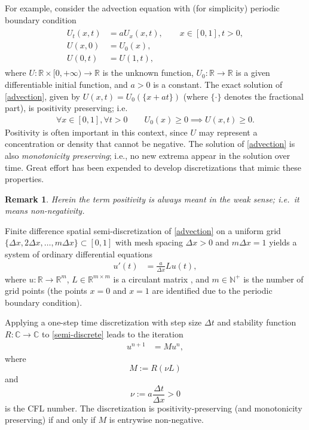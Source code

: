 \documentclass[smallextended,numbook,runningheads]{svjour3}     %
\newtheorem{remark}{Remark}
\newtheorem{remark}{Remark}
\newcommand{\dt}{\Delta t}
\newcommand{\dx}{\Delta x}
\begin{document}
For example, consider the advection equation with (for simplicity) periodic boundary condition
\begin{align}\label{advection}
\begin{split}
	U_t (x,t) &= a U_x(x,t), \qquad x\in[0,1], t>0, \\
	U(x,0) &= U_0(x), \\
	U(0,t) &= U(1,t),
\end{split}
\end{align}
where $U:\mathbb{R}\times [0,+\infty)\to\mathbb{R}$ is the unknown function, $U_0:\mathbb{R}\to\mathbb{R}$ is a given differentiable initial function, and $a>0$ is a constant. 
The exact solution of \eqref{advection}, given by $U(x,t) =
U_0(\{x+a t\})$ (where $\{\cdot\}$ denotes the fractional part), is positivity preserving; i.e.
\begin{align} \label{implies-positivity}
\forall x\in[0,1], \forall t>0\quad\quad U_0(x) \ge 0 \implies U(x,t) \ge 0.
\end{align}
Positivity is often important in this context, since $U$ may represent a
concentration or density that cannot be negative.  The solution of
\eqref{advection} is also \emph{monotonicity preserving}; i.e., no
new extrema appear in the solution over time.  Great effort has been
expended to develop discretizations that mimic these properties.

\begin{remark}
Herein the term {\emph{positivity}} is always meant in the weak sense;
i.e.~it means {\emph{non-negativity}}. 
\end{remark}



Finite difference spatial semi-discretization of \eqref{advection} on a uniform grid $\{\dx,2\dx,\ldots, m\dx\}\subset [0,1]$ 
with mesh spacing $\dx>0$ and $m\dx=1$ yields a system of ordinary differential equations
\begin{align} \label{semi-discrete}
    u'(t) & = \frac{a}{\dx}Lu(t),
\end{align}
where $u:\mathbb{R}\to\mathbb{R}^m$, $L\in\mathbb{R}^{m\times m}$ is a circulant matrix  \cite[Section 5.16]{matmat}, and $m \in\mathbb{N}^+$ is the number of grid points (the points $x=0$ and $x=1$ are identified due to the periodic boundary condition).

Applying a one-step time
discretization with step size $\dt$ and stability function $R:\mathbb{C}\to\mathbb{C}$ to \eqref{semi-discrete} leads to
the iteration
\begin{align}\label{M}
    u^{n+1} & = M u^n,
\end{align}
where 
\begin{equation}\label{Mdualdef}
M:=R(\nu L)
\end{equation}
and 
\begin{equation}\label{nudef}
\nu:=a\frac{\dt}{\dx}>0
\end{equation}
is the CFL number.  
The discretization is positivity-preserving (and monotonicity preserving) if
and only if $M$ is entrywise non-negative.
\end{document}
